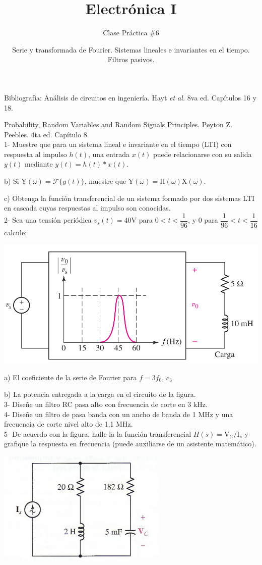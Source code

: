 \documentclass[10pt,letterpaper]{article}
\author{Clase Práctica $\#$6}
\title{Electrónica I}
\date{Serie y transformada de Fourier. Sistemas lineales e invariantes en el tiempo. Filtros pasivos.}
\begin{document}
	\maketitle
	
Bibliografía: Análisis de circuitos en ingeniería. Hayt \textit{et al.} 8va ed. Capítulos 16 y 18.

Probability, Random Variables and Random Signals Principles. Peyton Z. Peebles. 4ta ed. Capítulo 8.
\\

1- Muestre que para un sistema lineal e invariante en el tiempo (LTI) con respuesta al impulso $h(t)$, una entrada $x(t)$ puede relacionarse con su salida $y(t)$ mediante $y(t)=h(t)\ast x(t)$.

b) Si $\mathrm{Y}(\omega)=\mathcal{F}\{y(t)\}$, muestre que $\mathrm{Y}(\omega) = \mathrm{H}(\omega)\mathrm{X}(\omega)$.

c) Obtenga la función transferencial de un sistema formado por dos sistemas LTI en cascada cuyas respuestas al impulso son conocidas. \\

2- Sea una tensión periódica $v_s(t) = 40 \mathrm{V}$ para $0 < t < \dfrac{1}{96}$, y 0 para $\dfrac{1}{96} < t < \dfrac{1}{16}$ calcule:

\includegraphics[scale=0.3]{c2.png}

a) El coeficiente de la serie de Fourier para $f=3f_0$, \textbf{$c_3$}.

b) La potencia entregada a la carga en el circuito de la figura. \\

3- Diseñe un filtro RC pasa alto con frecuencia de corte en 3 kHz. \\

4- Diseñe un filtro de pasa banda con un ancho de banda de 1 MHz y una frecuencia de corte nivel alto de 1,1 MHz.\\

5- De acuerdo con la figura, halle la la función transferencial $H(s)=\mathrm{V}_C/\mathrm{I}_s$ y grafique la respuesta en frecuencia (puede auxiliarse de un asistente matemático).

\includegraphics[scale=0.6]{c5.png}

 
\end{document}
